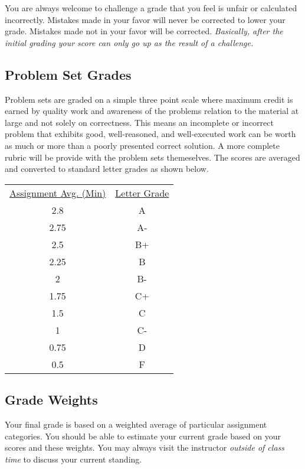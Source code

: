 \documentclass[nobib]{tufte-handout}
\begin{document}
You are always welcome to challenge a grade that you feel is unfair or calculated incorrectly.  Mistakes made in your favor will never be corrected to lower your grade.  Mistakes made not in your favor will be corrected.  \textit{Basically, after the initial grading your score can only go up as the result of a challenge.}

\subsection{Problem Set Grades}

Problem sets are graded on a simple three point scale where maximum credit is earned by quality work and awareness of the problems relation to the material at large and not solely on correctness.  This means an incomplete or incorrect problem that exhibits good, well-reasoned, and well-executed work can be worth as much or more than a poorly presented correct solution. A more complete rubric will be provide with the problem sets themeselves. The scores are averaged and converted to standard letter grades as shown below.

\begin{center}
\begin{small}
\begin{tabular}{cc}
\underline{Assignment Avg. (Min)} & \underline{Letter Grade} \\
2.8   & A  \\
2.75    & A- \\
2.5 & B+ \\
2.25    & B  \\
2   & B- \\
1.75    & C+ \\
1.5 & C  \\
1   & C- \\
0.75    & D  \\
0.5  & F
\end{tabular}
\end{small}
\end{center}


\subsection{Grade Weights}

Your final grade is based on a weighted average of particular assignment categories.  You should be able to estimate your current grade based on your scores and these weights.  You may always visit the instructor \textit{outside of class time} to discuss your current standing.
\end{document}
